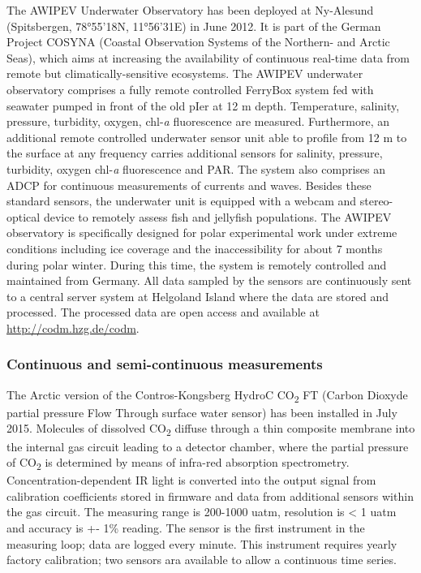 \documentclass[
]{article}
\begin{document}
The AWIPEV Underwater Observatory has been deployed at Ny-Alesund
(Spitsbergen, 78°55'18N, 11°56'31E) in June 2012. It is part of the
German Project COSYNA (Coastal Observation Systems of the Northern- and
Arctic Seas), which aims at increasing the availability of continuous
real-time data from remote but climatically-sensitive ecosystems. The
AWIPEV underwater observatory comprises a fully remote controlled
FerryBox system fed with seawater pumped in front of the old pIer at 12
m depth. Temperature, salinity, pressure, turbidity, oxygen,
chl-\emph{a} fluorescence are measured. Furthermore, an additional
remote controlled underwater sensor unit able to profile from 12 m to
the surface at any frequency carries additional sensors for salinity,
pressure, turbidity, oxygen chl-\emph{a} fluorescence and PAR. The
system also comprises an ADCP for continuous measurements of currents
and waves. Besides these standard sensors, the underwater unit is
equipped with a webcam and stereo-optical device to remotely assess fish
and jellyfish populations. The AWIPEV observatory is specifically
designed for polar experimental work under extreme conditions including
ice coverage and the inaccessibility for about 7 months during polar
winter. During this time, the system is remotely controlled and
maintained from Germany. All data sampled by the sensors are
continuously sent to a central server system at Helgoland Island where
the data are stored and processed. The processed data are open access
and available at \url{http://codm.hzg.de/codm}.

\hypertarget{continuous-and-semi-continuous-measurements}{%
\subsubsection{\texorpdfstring{\textbf{Continuous and semi-continuous
measurements}}{Continuous and semi-continuous measurements}}\label{continuous-and-semi-continuous-measurements}}

The Arctic version of the Contros-Kongsberg HydroC CO\textsubscript{2}
FT (Carbon Dioxyde partial pressure Flow Through surface water sensor)
has been installed in July 2015. Molecules of dissolved
CO\textsubscript{2} diffuse through a thin composite membrane into the
internal gas circuit leading to a detector chamber, where the partial
pressure of CO\textsubscript{2} is determined by means of infra-red
absorption spectrometry. Concentration-dependent IR light is converted
into the output signal from calibration coefficients stored in firmware
and data from additional sensors within the gas circuit. The measuring
range is 200-1000 uatm, resolution is \textless{} 1 uatm and accuracy is
+- 1\% reading. The sensor is the first instrument in the measuring
loop; data are logged every minute. This instrument requires yearly
factory calibration; two sensors ara available to allow a continuous
time series.
\end{document}
